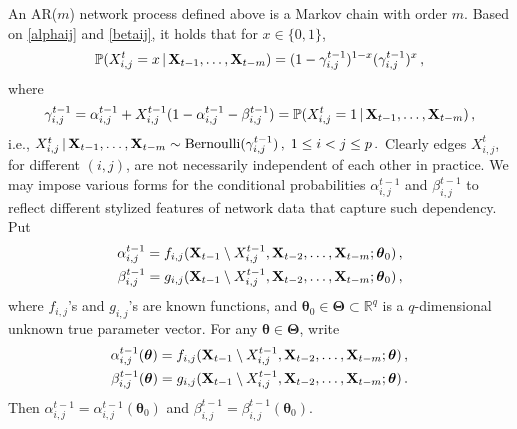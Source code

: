 \documentclass[12pt]{article}
\newcommand{\bTheta}{\boldsymbol \Theta}
\newcommand{\btheta}{\boldsymbol \theta}
\newcommand{\bX}{{\bf X}}
\newcommand{\bZ}{{\bf Z}}
\newcommand{\0}{{\bf 0}}
\begin{document}
An AR($m$) network process defined above is a Markov chain with
order $m$. Based on \eqref{alphaij} and \eqref{betaij}, 
it holds that for $x\in\{0, 1\}$,
\[
\mathbb{P}(X_{i,j}^t=x\,|\,\bX_{t-1}, \ldots, \bX_{t-m}) =
(1 - \gamma_{i,j}^{t-1})^{1-x}( \gamma_{i,j}^{t-1})^x\,,
\]
where
\begin{equation} \label{def1}
\gamma_{i,j}^{t-1} = \alpha_{i,j}^{t-1} +X_{i,j}^{t-1} (1 - \alpha_{i,j}^{t-1} -\beta_{i,j}^{t-1})
=\mathbb{P}(X_{i,j}^t=1\,|\,\bX_{t-1}, \ldots, \bX_{t-m})\,,
\end{equation}
i.e.,
$
X_{i,j}^t\,|\,\bX_{t-1},\ldots,\bX_{t-m}\sim {\rm Bernoulli}(\gamma_{i,j}^{t-1})\,,\; 1\leq i<j\leq p\,.
$
Clearly %
edges
$X_{i,j}^t$, for different $(i,j)$, are not necessarily independent of each other in practice. We may impose various forms for the conditional probabilities $\alpha_{i,j}^{t-1}$ and $\beta_{i,j}^{t-1}$ to reflect different stylized features of network data that capture such dependency. Put 
\begin{equation}\label{eq:alphaijbetaij}
\begin{split}
\alpha_{i,j}^{t-1} = f_{i,j}( \bX_{t-1}\setminus X_{i,j}^{t-1}, \bX_{t-2},\ldots, \bX_{t-m}; \btheta_0)\,,\\
\beta_{i,j}^{t-1} = g_{i,j} (\bX_{t-1}\setminus X_{i,j}^{t-1}, \bX_{t-2}, \ldots, \bX_{t-m}; \btheta_0)\,,
\end{split}
\end{equation}
where $f_{i,j}$'s and $g_{i,j}$'s are known functions, and $\btheta_0\in\bTheta\subset\mathbb{R}^q$ is a $q$-dimensional unknown true parameter vector. For any $\btheta\in\bTheta$, write 
\begin{equation}\nonumber 
\begin{split}
\alpha_{i,j}^{t-1}(\btheta) = f_{i,j}(\bX_{t-1}\setminus X_{i,j}^{t-1}, \bX_{t-2}, \ldots, \bX_{t-m}; \btheta)\,,\\
\beta_{i,j}^{t-1}(\btheta) = g_{i,j} (\bX_{t-1}\setminus X_{i,j}^{t-1}, \bX_{t-2}, \ldots, \bX_{t-m}; \btheta)\,.
\end{split}
\end{equation}
Then $\alpha_{i,j}^{t-1}=\alpha_{i,j}^{t-1}(\btheta_0)$ and $\beta_{i,j}^{t-1}=\beta_{i,j}^{t-1}(\btheta_0)$.
\end{document}
